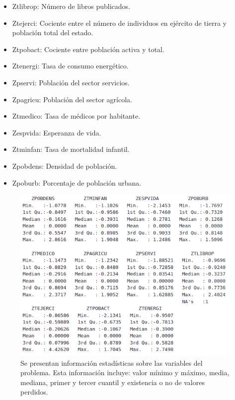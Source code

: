 \documentclass[11pt,a4paper]{article}
\begin{document}
    	\begin{itemize}
    	    \item Ztlibrop: Número de libros publicados.
    	    \item Ztejerci: Cociente entre el número de individuos en ejército de tierra y población total del estado.
    	    \item Ztpobact: Cociente entre población activa y total.
    	    \item Ztenergi: Tasa de consumo energético.
    	    \item Zpservi: Población del sector servicios.
    	    \item Zpagricu: Población del sector agrícola.
    	    \item Ztmedico: Tasa de médicos por habitante.
    	    \item Zespvida: Esperanza de vida.
    	    \item Ztminfan: Tasa de mortalidad infantil.
    	    \item Zpobdens: Densidad de población.
    	    \item Zpoburb: Porcentaje de población urbana.
    	\end{itemize}
    	
    	\begin{figure}[H]
    	    \centering
    	    \includegraphics[scale=0.5]{img1.png}
    	    \caption{Se presentan información estadísticas sobre las variables del problema. Esta información incluye: valor mínimo y máximo, media, mediana, primer y tercer cuantil y existencia o no de valores perdidos.}
    	    \label{img1}
    	\end{figure}
	
\end{document}
